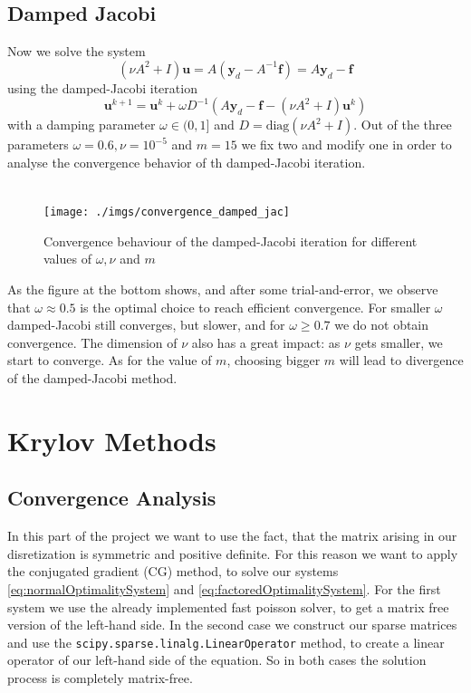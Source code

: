 \documentclass{amsart}
\theoremstyle{definition}
\theoremstyle{remark}
\numberwithin{equation}{section}
\renewcommand{\vec}{\textbf}
\begin{document}

\subsection{Damped Jacobi}
\label{sec:DampedJacobi}
Now we solve the system
\begin{equation}
(\nu A^2+ I) \vec{u} = A(\vec{y}_d-A^{-1}\vec{f}) = A\vec{y}_d-\vec{f}
\end{equation}
using the damped-Jacobi iteration
\begin{equation}
\vec{u}^{k+1} = \vec{u}^k + \omega D^{-1}\left(A \vec{y}_d-\vec{f}-(\nu A^2 + I)\vec{u}^k\right)
\end{equation}
with a damping parameter $\omega\in(0,1]$ and $D=\text{diag}(\nu A^2+I)$. Out of the three parameters $\omega=0.6, \nu=10^{-5}$ and $m=15$ we fix two and modify one in order to analyse the convergence behavior of th damped-Jacobi iteration.\\ \\
\begin{figure}[h!]
	\centering
	\texttt{[image: ./imgs/convergence\_damped\_jac]}
	\caption{Convergence behaviour of the damped-Jacobi iteration for different values of $\omega,\nu$ and $m$}
\end{figure}
As the  figure at the bottom shows, and after some trial-and-error, we observe that $\omega\approx0.5$ is the optimal choice to reach efficient convergence. For smaller $\omega$ damped-Jacobi still converges, but slower, and for $\omega\geq0.7$ we do not obtain convergence. The dimension of $\nu$ also has a great impact: as $\nu$ gets smaller, we start to converge. As for the value of $m$, choosing bigger $m$ will lead to divergence of the damped-Jacobi method.


\newpage
\section{Krylov Methods}


\subsection{Convergence Analysis}
In this part of the project we want to use the fact, that the matrix arising in our disretization is symmetric and positive definite. For this reason we 
want to apply the conjugated gradient (CG) method, to solve our systems \eqref{eq:normalOptimalitySystem} and \eqref{eq:factoredOptimalitySystem}.
For the first system we use the already implemented fast poisson solver, to get a matrix free version of the left-hand side. In the second case we 
construct our sparse matrices and use the \texttt{scipy.sparse.linalg.LinearOperator} method, to create a linear operator of our left-hand side of the 
equation. So in both cases the solution process is completely matrix-free.
\end{document}
